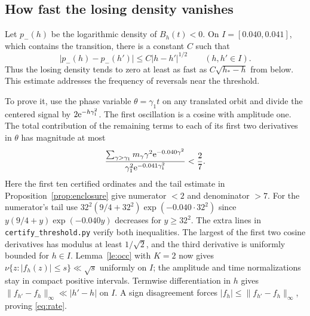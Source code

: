 \subsection{How fast the losing density vanishes}
Let \(p_-(h)\) be the logarithmic density of \(B_h(t)<0\). On \(I=[0.040,0.041]\), which contains the transition, there is a constant \(C\) such that
\begin{equation}
 |p_-(h)-p_-(h')|\le C|h-h'|^{1/2}\qquad(h,h'\in I).\label{eq:rate}
\end{equation}
Thus the losing density tends to zero at least as fast as \(C\sqrt{h_*-h}\) from below. This estimate addresses the frequency of reversals near the threshold.

To prove it, use the phase variable \(\theta=\gamma_1 t\) on any translated orbit and divide the centered signal by \(2\mathrm e^{-h\gamma_1^2}\). The first oscillation is a cosine with amplitude one. The total contribution of the remaining terms to each of its first two derivatives in \(\theta\) has magnitude at most
\[
 \frac{\sum_{\gamma>\gamma_1} m_\gamma\gamma^2\mathrm e^{-0.040\gamma^2}}
      {\gamma_1^2\mathrm e^{-0.041\gamma_1^2}} < \frac{2}{7}.
\]
Here the first ten certified ordinates and the tail estimate in Proposition~\ref{prop:enclosure} give numerator \(<2\) and denominator \(>7\). For the numerator's tail use
\(32^2(9/4+32^2)\exp(-0.040\cdot32^2)\) since
\(y(9/4+y)\exp(-0.040y)\) decreases for \(y\ge32^2\).
The extra lines in \texttt{certify\_threshold.py} verify both inequalities. The largest of the first two cosine derivatives has modulus at least \(1/\sqrt2\), and the third derivative is uniformly bounded for \(h\in I\). Lemma~\ref{le:occ} with \(K=2\) now gives \(\nu\{z:|f_h(z)|\le s\}\ll\sqrt{s}\) uniformly on \(I\); the amplitude and time normalizations stay in compact positive intervals. Termwise differentiation in \(h\) gives \(\|f_{h'}-f_h\|_\infty\ll|h'-h|\) on \(I\). A sign disagreement forces \(|f_h|\le\|f_{h'}-f_h\|_\infty\), proving \eqref{eq:rate}.
